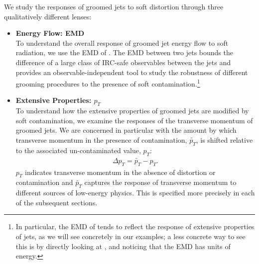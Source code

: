 We study the responses of groomed jets to soft distortion through three qualitatively different lenses:
\begin{itemize}
    \item \textbf{Energy Flow: EMD}
    \\
    To understand the overall response of groomed jet energy flow to soft radiation, we use the EMD of .
    The EMD between two jets bounds the difference of a large class of IRC-safe observables between the jets and provides an observable-independent tool to study the robustness of different grooming procedures to the presence of soft contamination.\footnote{
    In particular, the EMD of  tends to reflect the response of extensive properties of jets, as we will see concretely in our examples;
    a less concrete way to see this is by directly looking at , and noticing that the EMD has units of energy.
    }

    \item \textbf{Extensive Properties: \(p_T\)}
    \\
    To understand how the extensive properties of groomed jets are modified by soft contamination, we examine the responses of the transverse momentum of groomed jets.
    We are concerned in particular with the amount by which transverse momentum in the presence of contamination, \(\widetilde{p_T}\), is shifted relative to the associated un-contaminated value, \(p_T\):
    \begin{align}
        \Delta p_T = \widetilde{p_T}- p_T
        .
        \label{eqn:pt_response}
    \end{align}
   \(p_T\) indicates transverse momentum in the absence of distortion or contamination and \(\widetilde{p_T}\) captures the response of transverse momentum to different sources of low-energy physics.
   This is specified more precisely in each of the subsequent sections.


\end{itemize}
